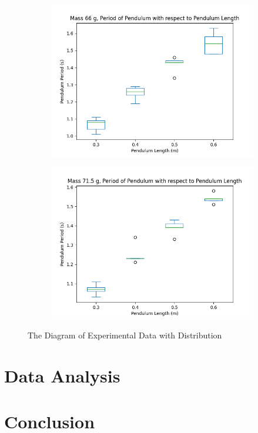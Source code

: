 \documentclass{article}
\begin{document}
\begin{figure}[ht!]
    \begin{subfigure}{0.49\textwidth}
        \centering
        \includegraphics[width=\linewidth]{mass3.png}
        \label{fig:graph_m3}
    \end{subfigure}
    \hfil
    \begin{subfigure}{0.49\textwidth}
        \centering
        \includegraphics[width=\linewidth]{mass4.png}
        \label{fig:graph_m4}
    \end{subfigure}
    \caption{The Diagram of Experimental Data with Distribution}
\end{figure}

\pagebreak

\pagebreak

\section{Data Analysis}

\section{Conclusion}
\end{document}

